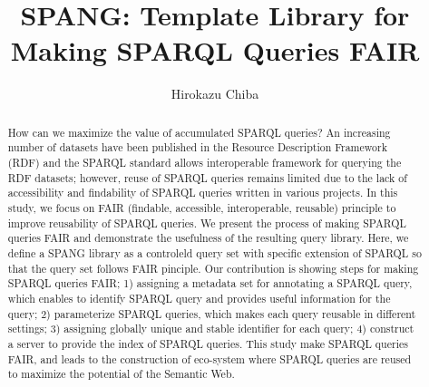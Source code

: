 \documentclass[runningheads]{llncs}
\begin{document}
\title{SPANG: Template Library for Making SPARQL Queries FAIR}
\author{Hirokazu Chiba}
%
\maketitle              %
%
\begin{abstract}
How can we maximize the value of accumulated SPARQL queries? 
An increasing number of datasets have been published in the Resource Description Framework (RDF) and the SPARQL standard allows interoperable framework for querying the RDF datasets; however, reuse of SPARQL queries remains limited due to the lack of accessibility and findability of SPARQL queries written in various projects. 
In this study, we focus on FAIR (findable, accessible, interoperable,
reusable) principle to improve reusability of SPARQL queries.
We present the process of making SPARQL queries FAIR and demonstrate the usefulness of the resulting query library.
Here, we define a SPANG library as a controleld query set with specific
extension of SPARQL so that the query set follows FAIR pinciple.
Our contribution is showing steps for making SPARQL queries FAIR;
1) assigning a metadata set for annotating a SPARQL query, which
enables to identify SPARQL query and provides useful information for the query;
2) parameterize SPARQL queries, which makes each query reusable in different settings;
3) assigning globally unique and stable identifier for each query;
4) construct a server to provide the index of SPARQL queries.
This study make SPARQL queries FAIR, and leads to the construction of eco-system where SPARQL queries are reused to maximize the potential of the Semantic Web.


\end{abstract}
\end{document}
